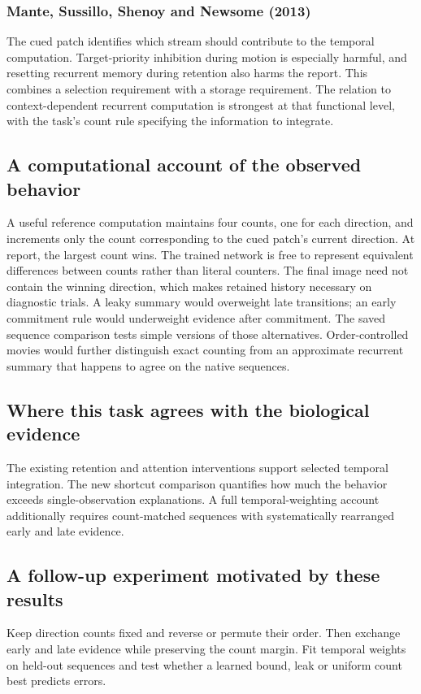 \documentclass[11pt]{article}
\begin{document}
\subsubsection{Mante, Sussillo, Shenoy and Newsome (2013)}
The cued patch identifies which stream should contribute to the temporal computation. Target-priority inhibition during motion is especially harmful, and resetting recurrent memory during retention also harms the report. This combines a selection requirement with a storage requirement. The relation to context-dependent recurrent computation is strongest at that functional level, with the task’s count rule specifying the information to integrate. \cite{bio_mante}

\subsection{A computational account of the observed behavior}
A useful reference computation maintains four counts, one for each direction, and increments only the count corresponding to the cued patch’s current direction. At report, the largest count wins. The trained network is free to represent equivalent differences between counts rather than literal counters. The final image need not contain the winning direction, which makes retained history necessary on diagnostic trials. A leaky summary would overweight late transitions; an early commitment rule would underweight evidence after commitment. The saved sequence comparison tests simple versions of those alternatives. Order-controlled movies would further distinguish exact counting from an approximate recurrent summary that happens to agree on the native sequences.

\subsection{Where this task agrees with the biological evidence}
The existing retention and attention interventions support selected temporal integration. The new shortcut comparison quantifies how much the behavior exceeds single-observation explanations. A full temporal-weighting account additionally requires count-matched sequences with systematically rearranged early and late evidence.

\subsection{A follow-up experiment motivated by these results}
Keep direction counts fixed and reverse or permute their order. Then exchange early and late evidence while preserving the count margin. Fit temporal weights on held-out sequences and test whether a learned bound, leak or uniform count best predicts errors.
\end{document}
